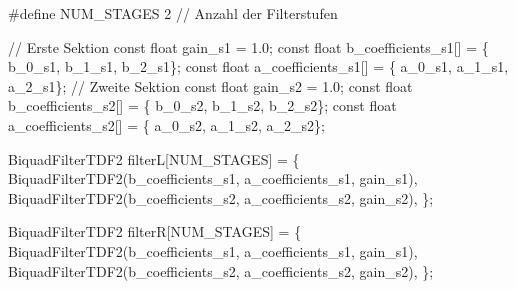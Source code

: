 \documentclass[
  ngerman,
  letterpaper,
  DIV=11]{scrreprt}
\newenvironment{Shaded}{\begin{snugshade}}{\end{snugshade}}
\newcommand{\AttributeTok}[1]{\textcolor[rgb]{0.40,0.45,0.13}{#1}}
\newcommand{\CommentTok}[1]{\textcolor[rgb]{0.37,0.37,0.37}{#1}}
\newcommand{\DataTypeTok}[1]{\textcolor[rgb]{0.68,0.00,0.00}{#1}}
\newcommand{\DecValTok}[1]{\textcolor[rgb]{0.68,0.00,0.00}{#1}}
\newcommand{\FloatTok}[1]{\textcolor[rgb]{0.68,0.00,0.00}{#1}}
\newcommand{\NormalTok}[1]{\textcolor[rgb]{0.00,0.23,0.31}{#1}}
\newcommand{\OperatorTok}[1]{\textcolor[rgb]{0.37,0.37,0.37}{#1}}
\newcommand{\PreprocessorTok}[1]{\textcolor[rgb]{0.68,0.00,0.00}{#1}}
\begin{document}
\begin{Shaded}
\begin{Highlighting}[]
\PreprocessorTok{\#define NUM\_STAGES }\DecValTok{2}\PreprocessorTok{ }\CommentTok{// Anzahl der Filterstufen}

\CommentTok{// Erste Sektion}
\AttributeTok{const} \DataTypeTok{float}\NormalTok{ gain\_s1 }\OperatorTok{=} \FloatTok{1.0}\OperatorTok{;}
\AttributeTok{const} \DataTypeTok{float}\NormalTok{ b\_coefficients\_s1}\OperatorTok{[]} \OperatorTok{=} \OperatorTok{\{}\NormalTok{ b\_0\_s1}\OperatorTok{,}\NormalTok{ b\_1\_s1}\OperatorTok{,}\NormalTok{ b\_2\_s1}\OperatorTok{\};}
\AttributeTok{const} \DataTypeTok{float}\NormalTok{ a\_coefficients\_s1}\OperatorTok{[]} \OperatorTok{=} \OperatorTok{\{}\NormalTok{ a\_0\_s1}\OperatorTok{,}\NormalTok{ a\_1\_s1}\OperatorTok{,}\NormalTok{ a\_2\_s1}\OperatorTok{\};}
\CommentTok{// Zweite Sektion}
\AttributeTok{const} \DataTypeTok{float}\NormalTok{ gain\_s2 }\OperatorTok{=} \FloatTok{1.0}\OperatorTok{;}
\AttributeTok{const} \DataTypeTok{float}\NormalTok{ b\_coefficients\_s2}\OperatorTok{[]} \OperatorTok{=} \OperatorTok{\{}\NormalTok{ b\_0\_s2}\OperatorTok{,}\NormalTok{ b\_1\_s2}\OperatorTok{,}\NormalTok{ b\_2\_s2}\OperatorTok{\};}
\AttributeTok{const} \DataTypeTok{float}\NormalTok{ a\_coefficients\_s2}\OperatorTok{[]} \OperatorTok{=} \OperatorTok{\{}\NormalTok{ a\_0\_s2}\OperatorTok{,}\NormalTok{ a\_1\_s2}\OperatorTok{,}\NormalTok{ a\_2\_s2}\OperatorTok{\};}

\NormalTok{BiquadFilterTDF2 filterL}\OperatorTok{[}\NormalTok{NUM\_STAGES}\OperatorTok{]} \OperatorTok{=} \OperatorTok{\{}
\NormalTok{  BiquadFilterTDF2}\OperatorTok{(}\NormalTok{b\_coefficients\_s1}\OperatorTok{,}\NormalTok{ a\_coefficients\_s1}\OperatorTok{,}\NormalTok{ gain\_s1}\OperatorTok{),}
\NormalTok{  BiquadFilterTDF2}\OperatorTok{(}\NormalTok{b\_coefficients\_s2}\OperatorTok{,}\NormalTok{ a\_coefficients\_s2}\OperatorTok{,}\NormalTok{ gain\_s2}\OperatorTok{),}
\OperatorTok{\};}

\NormalTok{BiquadFilterTDF2 filterR}\OperatorTok{[}\NormalTok{NUM\_STAGES}\OperatorTok{]} \OperatorTok{=} \OperatorTok{\{}
\NormalTok{  BiquadFilterTDF2}\OperatorTok{(}\NormalTok{b\_coefficients\_s1}\OperatorTok{,}\NormalTok{ a\_coefficients\_s1}\OperatorTok{,}\NormalTok{ gain\_s1}\OperatorTok{),}
\NormalTok{  BiquadFilterTDF2}\OperatorTok{(}\NormalTok{b\_coefficients\_s2}\OperatorTok{,}\NormalTok{ a\_coefficients\_s2}\OperatorTok{,}\NormalTok{ gain\_s2}\OperatorTok{),}
\OperatorTok{\};}
\end{Highlighting}
\end{Shaded}
\end{document}
